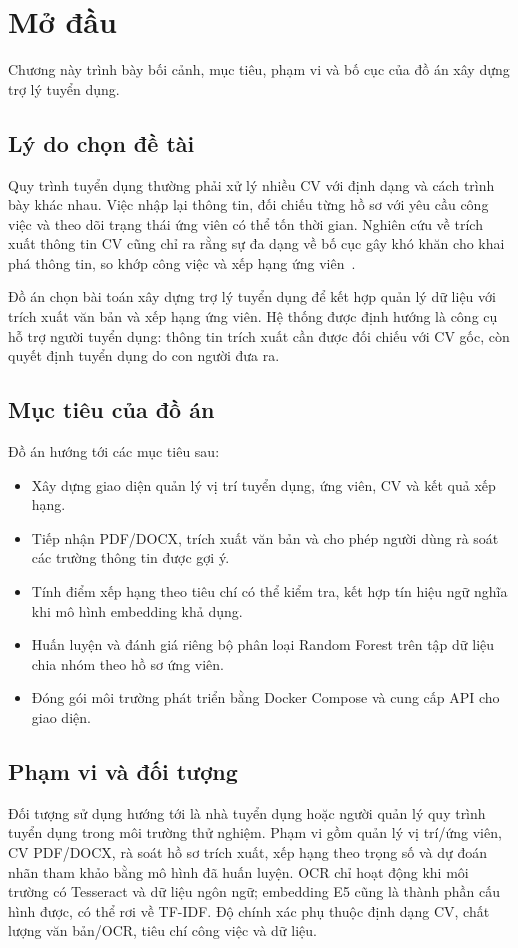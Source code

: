 \chapter{Mở đầu}
\label{ch:modau}

\begin{muctieu}
Chương này trình bày bối cảnh, mục tiêu, phạm vi và bố cục của đồ án xây dựng trợ lý tuyển dụng.
\end{muctieu}

\section{Lý do chọn đề tài}
Quy trình tuyển dụng thường phải xử lý nhiều CV với định dạng và cách trình bày khác nhau. Việc nhập lại thông tin, đối chiếu từng hồ sơ với yêu cầu công việc và theo dõi trạng thái ứng viên có thể tốn thời gian. Nghiên cứu về trích xuất thông tin CV cũng chỉ ra rằng sự đa dạng về bố cục gây khó khăn cho khai phá thông tin, so khớp công việc và xếp hạng ứng viên~\cite{Chen2018,Palshikar2023}.

Đồ án chọn bài toán xây dựng trợ lý tuyển dụng để kết hợp quản lý dữ liệu với trích xuất văn bản và xếp hạng ứng viên. Hệ thống được định hướng là công cụ hỗ trợ người tuyển dụng: thông tin trích xuất cần được đối chiếu với CV gốc, còn quyết định tuyển dụng do con người đưa ra.

\section{Mục tiêu của đồ án}
Đồ án hướng tới các mục tiêu sau:
\begin{itemize}[leftmargin=1.6em,itemsep=2pt]
  \item Xây dựng giao diện quản lý vị trí tuyển dụng, ứng viên, CV và kết quả xếp hạng.
  \item Tiếp nhận PDF/DOCX, trích xuất văn bản và cho phép người dùng rà soát các trường thông tin được gợi ý.
  \item Tính điểm xếp hạng theo tiêu chí có thể kiểm tra, kết hợp tín hiệu ngữ nghĩa khi mô hình embedding khả dụng.
  \item Huấn luyện và đánh giá riêng bộ phân loại Random Forest trên tập dữ liệu chia nhóm theo hồ sơ ứng viên.
  \item Đóng gói môi trường phát triển bằng Docker Compose và cung cấp API cho giao diện.
\end{itemize}

\section{Phạm vi và đối tượng}
Đối tượng sử dụng hướng tới là nhà tuyển dụng hoặc người quản lý quy trình tuyển dụng trong môi trường thử nghiệm. Phạm vi gồm quản lý vị trí/ứng viên, CV PDF/DOCX, rà soát hồ sơ trích xuất, xếp hạng theo trọng số và dự đoán nhãn tham khảo bằng mô hình đã huấn luyện. OCR chỉ hoạt động khi môi trường có Tesseract và dữ liệu ngôn ngữ; embedding E5 cũng là thành phần cấu hình được, có thể rơi về TF-IDF. Độ chính xác phụ thuộc định dạng CV, chất lượng văn bản/OCR, tiêu chí công việc và dữ liệu.

